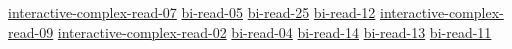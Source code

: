 \hyperref[sec:interactive-complex-read-07]{interactive-complex-read-07}
\hyperref[sec:bi-read-05]{bi-read-05}
\hyperref[sec:bi-read-25]{bi-read-25}
\hyperref[sec:bi-read-12]{bi-read-12}
\hyperref[sec:interactive-complex-read-09]{interactive-complex-read-09}
\hyperref[sec:interactive-complex-read-02]{interactive-complex-read-02}
\hyperref[sec:bi-read-04]{bi-read-04}
\hyperref[sec:bi-read-14]{bi-read-14}
\hyperref[sec:bi-read-13]{bi-read-13}
\hyperref[sec:bi-read-11]{bi-read-11}

